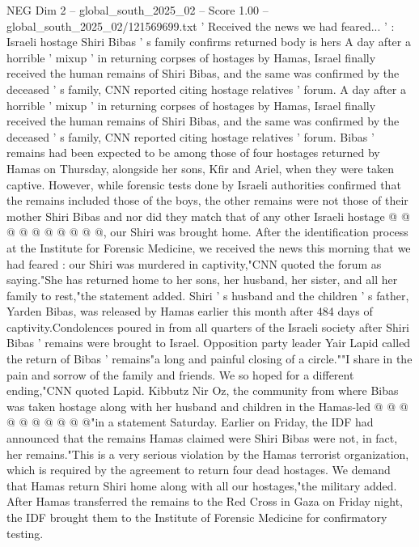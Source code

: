 \begin{textsample}{NEG Dim 2 – global\_south\_2025\_02 – Score 1.00 – global\_south\_2025\_02/121569699.txt}  \label{ex:f2_neg_073}
' Received the news we had feared... ' : Israeli hostage Shiri Bibas ' s family confirms returned body is hers A day after a horrible ' mixup ' in returning corpses of hostages by Hamas, Israel finally received the human remains of Shiri Bibas, and the same was confirmed by the deceased ' s family, CNN reported citing hostage relatives ' forum.
A day after a horrible ' mixup ' in returning corpses of hostages by Hamas, Israel finally received the human remains of Shiri Bibas, and the same was confirmed by the deceased ' s family, CNN reported citing hostage relatives ' forum.
Bibas ' remains had been expected to be among those of four hostages returned by Hamas on Thursday, alongside her sons, Kfir and Ariel, when they were taken captive.
However, while forensic tests done by Israeli authorities confirmed that the remains included those of the boys, the other remains were not those of their mother Shiri Bibas and nor did they match that of any other Israeli hostage @ @ @ @ @ @ @ @ @ @, our Shiri was brought home.
After the identification process at the Institute for Forensic Medicine, we received the news this morning that we had feared : our Shiri was murdered in captivity,"CNN quoted the forum as saying."She has returned home to her sons, her husband, her sister, and all her family to rest,"the statement added.
Shiri ' s husband and the children ' s father, Yarden Bibas, was released by Hamas earlier this month after 484 days of captivity.Condolences poured in from all quarters of the Israeli society after Shiri Bibas ' remains were brought to Israel.
Opposition party leader Yair Lapid called the return of Bibas ' remains"a long and painful closing of a circle.""I share in the pain and sorrow of the family and friends.
We so hoped for a different ending,"CNN quoted Lapid.
Kibbutz Nir Oz, the community from where Bibas was taken hostage along with her husband and children in the Hamas-led @ @ @ @ @ @ @ @ @ @"in a statement Saturday.
Earlier on Friday, the IDF had announced that the remains Hamas claimed were Shiri Bibas were not, in fact, her remains."This is a very serious violation by the Hamas terrorist organization, which is required by the agreement to return four dead hostages.
We demand that Hamas return Shiri home along with all our hostages,"the military added.
After Hamas transferred the remains to the Red Cross in Gaza on Friday night, the IDF brought them to the Institute of Forensic Medicine for confirmatory testing.

\end{textsample}
